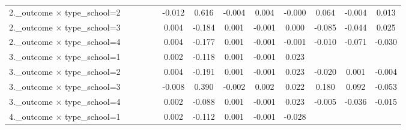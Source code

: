 {\begin{tabular}{l*{12}{c}}
2.\_outcome $\times$ type\_school=2&                     &                     &                     &                     &      -0.012\sym{**} &       0.616\sym{*}  &      -0.004\sym{***}&       0.004\sym{***}&      -0.000         &       0.064         &      -0.004         &       0.013         \\
2.\_outcome $\times$ type\_school=3&                     &                     &                     &                     &       0.004\sym{**} &      -0.184\sym{*}  &       0.001\sym{***}&      -0.001\sym{***}&       0.000         &      -0.085\sym{***}&      -0.044         &       0.025         \\
2.\_outcome $\times$ type\_school=4&                     &                     &                     &                     &       0.004\sym{**} &      -0.177\sym{*}  &       0.001\sym{***}&      -0.001\sym{***}&      -0.001         &      -0.010         &      -0.071\sym{**} &      -0.030         \\
3.\_outcome $\times$ type\_school=1&                     &                     &                     &                     &       0.002\sym{**} &      -0.118\sym{*}  &       0.001\sym{***}&      -0.001\sym{***}&       0.023         &                     &                     &                     \\
3.\_outcome $\times$ type\_school=2&                     &                     &                     &                     &       0.004\sym{**} &      -0.191\sym{*}  &       0.001\sym{***}&      -0.001\sym{***}&       0.023         &      -0.020         &       0.001         &      -0.004         \\
3.\_outcome $\times$ type\_school=3&                     &                     &                     &                     &      -0.008\sym{**} &       0.390\sym{*}  &      -0.002\sym{***}&       0.002\sym{***}&       0.022         &       0.180\sym{***}&       0.092         &      -0.053         \\
3.\_outcome $\times$ type\_school=4&                     &                     &                     &                     &       0.002\sym{**} &      -0.088\sym{*}  &       0.001\sym{***}&      -0.001\sym{***}&       0.023         &      -0.005         &      -0.036\sym{**} &      -0.015         \\
4.\_outcome $\times$ type\_school=1&                     &                     &                     &                     &       0.002\sym{**} &      -0.112\sym{*}  &       0.001\sym{***}&      -0.001\sym{***}&      -0.028\sym{***}&                     &                     &                     \\

\end{tabular}}
